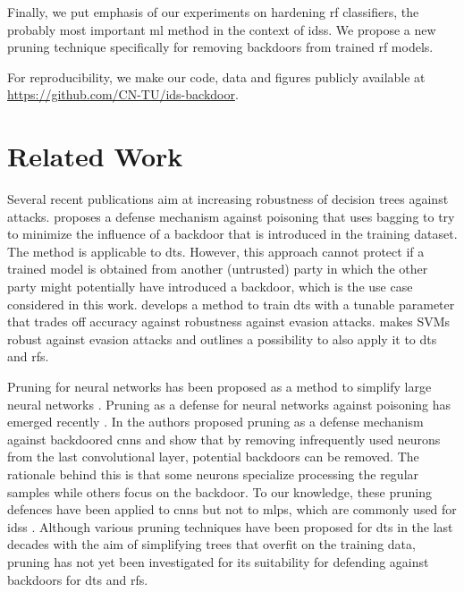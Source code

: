 \documentclass[9pt,sigconf,letterpaper,dvipsnames\ifx\removeHeaders\tempYes ,nonacm\fi]{acmart}
\newcommand\note[2]{{\color{#1}#2}}
\newcommand\todo[1]{{\note{red}{TODO: #1}}}
\begin{document}

Finally, we put emphasis of our experiments on hardening \gls{rf} classifiers, the probably most important \gls{ml} method in the context of \glspl{ids}.
We propose a new pruning technique specifically for removing backdoors from trained \gls{rf} models.

For reproducibility, we make our code, data and figures publicly available at \url{https://github.com/CN-TU/ids-backdoor}.

\section{Related Work}

Several recent publications aim at
increasing robustness of decision trees against attacks. \cite{biggio_bagging_2011} proposes a defense mechanism against poisoning that uses bagging to try to minimize the influence of a backdoor that is introduced in the training dataset. The method is applicable to \glspl{dt}. However, this approach cannot protect if a trained model is obtained from another (untrusted) party in which the other party might potentially have introduced a backdoor, which is the use case considered in this work. \cite{chen_robust_2019} develops a method to train \glspl{dt} with a tunable parameter that trades off accuracy against robustness against evasion attacks. \cite{russu_secure_2016} makes SVMs robust against evasion attacks and outlines a possibility to also apply it to \glspl{dt} and \glspl{rf}.

Pruning for neural networks has been proposed
as a method to simplify large neural networks \cite{sietsma_neural_1988}.
Pruning as a defense for neural networks against poisoning has emerged recently \cite{gu_badnets:_2017}. In \cite{gu_badnets:_2017} the authors proposed pruning as a defense mechanism against backdoored \glspl{cnn} and show that by removing infrequently used neurons from the last convolutional layer, potential backdoors can be removed. The rationale behind this is that some neurons specialize processing the regular samples while others focus on the backdoor.
To our knowledge, these pruning defences have been applied to \glspl{cnn} but not to \glspl{mlp}, which are commonly used for \glspl{ids} \cite{meghdouri_analysis_2018}. Although various pruning techniques have been proposed for \glspl{dt} in the last decades \cite{esposito_comparative_1997} with the aim of simplifying trees that overfit on the training data, pruning has not yet been investigated for its suitability for defending against backdoors for \glspl{dt} and \glspl{rf}.
\end{document}
